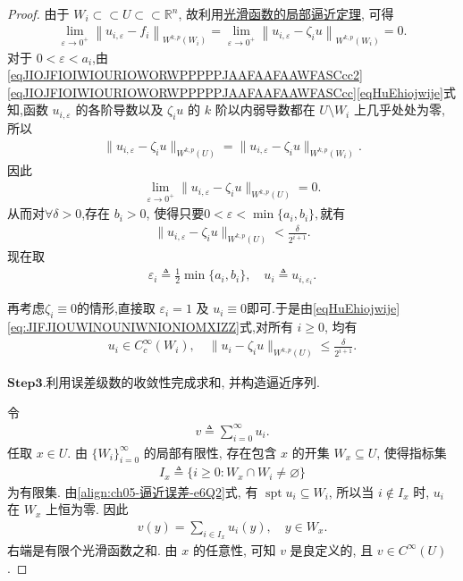 \documentclass[../../main.tex]{subfiles}
\begin{document}
\begin{proof}
由于 $W_i\subset \subset U\subset \subset \mathbb{R}^n$, 故利用\hyperref[theorem:ch05-光滑函数的局部逼近定理]{光滑函数的局部逼近定理}, 可得
\begin{align*}
\lim_{\varepsilon \rightarrow 0^+} \left\| u_{i,\varepsilon}-f_i \right\| _{W^{k,p}(W_i)}=\lim_{\varepsilon \rightarrow 0^+} \left\| u_{i,\varepsilon}-\zeta _iu \right\| _{W^{k,p}(W_i)}=0.
\end{align*}
对于 $0<\varepsilon<a_i$,由\eqref{eqJIOJFIOIWIOURIOWORWPPPPPJAAFAAFAAWFASCcc2}\eqref{eqJIOJFIOIWIOURIOWORWPPPPPJAAFAAFAAWFASCcc}\eqref{eqHuEhiojwije}式知,函数 $u_{i,\varepsilon}$ 的各阶导数以及 $\zeta_i u$ 的 $k$ 阶以内弱导数都在 $U\setminus W_i$ 上几乎处处为零, 所以
\begin{align*}
\|u_{i,\varepsilon}-\zeta_i u\|_{W^{k,p}(U)}
=
\|u_{i,\varepsilon}-\zeta_i u\|_{W^{k,p}(W_i)}.
\end{align*}
因此
\begin{align*}
\lim\limits_{\varepsilon\to0^+}
\|u_{i,\varepsilon}-\zeta_i u\|_{W^{k,p}(U)}
=0.
\end{align*}
从而对$\forall \delta>0$,存在 $b_i>0$, 使得只要$0<\varepsilon<\min\{a_i,b_i\},$就有
\begin{align}\label{eq:JIFJIOUWINOUNIWNIONIOMXIZZ}
\|u_{i,\varepsilon}-\zeta_i u\|_{W^{k,p}(U)}
<\frac{\delta}{2^{i+1}}.
\end{align}
现在取
\begin{align*}
\varepsilon_i
\triangleq\frac{1}{2}\min\{a_i,b_i\},
\quad
u_i\triangleq u_{i,\varepsilon_i}.
\end{align*}

再考虑$\zeta_i\equiv0$的情形,直接取 $\varepsilon_i=1$ 及 $u_i\equiv 0$即可.于是由\eqref{eqHuEhiojwije}\eqref{eq:JIFJIOUWINOUNIWNIONIOMXIZZ}式,对所有 $i\geqslant0$, 均有
\begin{align}
u_i\in C_c^\infty(W_i),\quad
\|u_i-\zeta_i u\|_{W^{k,p}(U)}
\leqslant\frac{\delta}{2^{i+1}}.
\label{align:ch05-逼近误差-e6Q2}
\end{align}

\noindent$\mathbf{Step}\mathbf{3}.${\heiti 利用误差级数的收敛性完成求和, 并构造逼近序列.}

令
\begin{align*}
v\triangleq\sum\limits_{i=0}^{\infty}u_i.
\end{align*}
任取 $x\in U$. 由 $\{W_i\}_{i=0}^{\infty}$ 的局部有限性, 存在包含 $x$ 的开集 $W_x\subseteq U$, 使得指标集
\begin{align*}
I_x\triangleq\{i\geqslant0:W_x\cap W_i\neq\varnothing\}
\end{align*}
为有限集.
由\eqref{align:ch05-逼近误差-e6Q2}式, 有 $\operatorname{spt}u_i\subseteq W_i$, 所以当 $i\notin I_x$ 时, $u_i$ 在 $W_x$ 上恒为零.
因此
\begin{align*}
v(y)=\sum\limits_{i\in I_x}u_i(y),\quad y\in W_x.
\end{align*}
右端是有限个光滑函数之和. 由 $x$ 的任意性, 可知 $v$ 是良定义的, 且 $v\in C^\infty(U)$.


\end{proof}
\end{document}
